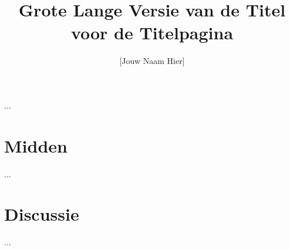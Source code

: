 \documentclass[stu,12pt,floatsintext]{apa7}
\title{Grote Lange Versie van de Titel voor de Titelpagina}
\author{[Jouw Naam Hier]}
\begin{document}
\maketitle  %


...

\section{Midden}

...

\section{Discussie}

...

\printbibliography
\end{document}
